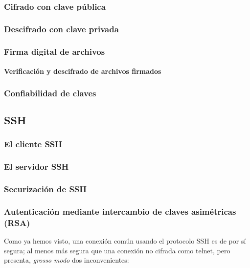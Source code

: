\documentclass[a4paper, 11pt, titlepage]{article}
\begin{document}
        \subsubsection{Cifrado con clave pública}

        \subsubsection{Descifrado con clave privada}

    \subsubsection{Firma digital de archivos}

        \paragraph{Verificación y descifrado de archivos firmados}

    \subsubsection{Confiabilidad de claves}

    \subsection{SSH}

    \subsubsection{El cliente SSH}
    \subsubsection{El servidor SSH}
    \subsubsection{Securización de SSH}
    \subsubsection{Autenticación mediante intercambio de claves asimétricas (RSA)}

        Como ya hemos visto, una conexión común usando el protocolo SSH es de por sí 
        segura; al menos más segura que una conexión no cifrada como telnet, pero presenta,
        \textit{grosso modo} dos inconvenientes:
\end{document}
